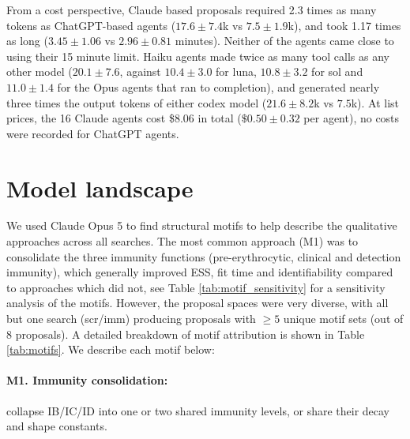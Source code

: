 \documentclass[11pt]{article}
\newcommand{\better}[1]{\textcolor{green!50!black}{#1}}
\newcommand{\worse}[1]{\textcolor{red!75!black}{#1}}
\begin{document}
\begin{table}
  \caption{Evaluation of every proposal that compiled and fit, across the local searches (\emph{inc}/\emph{scr} starting point $\times$ \emph{cur}/\emph{imm} aperture) and the frontier searches (named by proposing model), ranked by training elpd. $\Delta$ columns are paired differences from the incumbent ($\mathrm{elpd} = -187.5$ over 35 held-out observations, $\mathrm{elpd}_{\mathrm{train}} = -770.9$ over 99 training observations) with the standard error of the paired difference; positive is better. Differences more than two standard errors from zero are coloured \better{green} where the proposal is better than the incumbent and \worse{red} where it is worse. $\star$ marks a starting model rather than a proposal; min is fitting time in minutes.}
  \label{tab:evaluation}
\end{table}

From a cost perspective, Claude based proposals required 2.3 times as many tokens as ChatGPT-based agents ($17.6 \pm 7.4$k vs $7.5 \pm 1.9$k), and took 1.17 times as long ($3.45 \pm 1.06$ vs $2.96 \pm 0.81$ minutes). Neither of the agents came close to using their 15 minute limit. Haiku agents made twice as many tool calls as any other model ($20.1 \pm 7.6$, against $10.4 \pm 3.0$ for luna, $10.8 \pm 3.2$ for sol and $11.0 \pm 1.4$ for the Opus agents that ran to completion), and generated nearly three times the output tokens of either codex model ($21.6 \pm 8.2$k vs $7.5$k). At list prices, the 16 Claude agents cost \$8.06 in total ($\$0.50 \pm 0.32$ per agent), no costs were recorded for ChatGPT agents.

\section{Model landscape}

We used Claude Opus 5 to find structural motifs to help describe the qualitative approaches across all searches. The most common approach (M1) was to consolidate the three immunity functions (pre-erythrocytic, clinical and detection immunity), which generally improved ESS, fit time and identifiability compared to approaches which did not, see Table \ref{tab:motif_sensitivity} for a sensitivity analysis of the motifs. However, the proposal spaces were very diverse, with all but one search (scr/imm) producing proposals with $\geq 5$ unique motif sets (out of 8 proposals). A detailed breakdown of motif attribution is shown in Table \ref{tab:motifs}. We describe each motif below:

\paragraph{M1. Immunity consolidation:} collapse IB/IC/ID into one or two shared immunity levels, or share their decay and shape constants.
\end{document}
